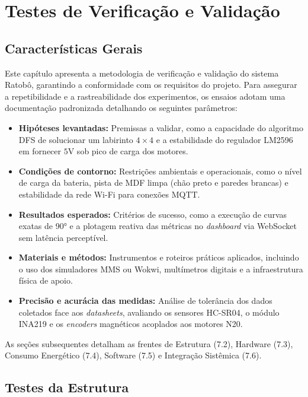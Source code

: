 \chapter{Testes de Verificação e Validação}
\vspace{-1cm}
\section{Características Gerais}

Este capítulo apresenta a metodologia de verificação e validação do sistema Ratobô, garantindo a conformidade com os requisitos do projeto. Para assegurar a repetibilidade e a rastreabilidade dos experimentos, os ensaios adotam uma documentação padronizada detalhando os seguintes parâmetros:

\begin{itemize}
    \item \textbf{Hipóteses levantadas:} Premissas a validar, como a capacidade do algoritmo DFS de solucionar um labirinto $4 \times 4$ e a estabilidade do regulador LM2596 em fornecer $5\text{V}$ sob pico de carga dos motores.
    \item \textbf{Condições de contorno:} Restrições ambientais e operacionais, como o nível de carga da bateria, pista de MDF limpa (chão preto e paredes brancas) e estabilidade da rede Wi-Fi para conexões MQTT.
    \item \textbf{Resultados esperados:} Critérios de sucesso, como a execução de curvas exatas de 90° e a plotagem reativa das métricas no \textit{dashboard} via WebSocket sem latência perceptível.
    \item \textbf{Materiais e métodos:} Instrumentos e roteiros práticos aplicados, incluindo o uso dos simuladores MMS ou Wokwi, multímetros digitais e a infraestrutura física de apoio.
    \item \textbf{Precisão e acurácia das medidas:} Análise de tolerância dos dados coletados face aos \textit{datasheets}, avaliando os sensores HC-SR04, o módulo INA219 e os \textit{encoders} magnéticos acoplados aos motores N20.
\end{itemize}

As seções subsequentes detalham as frentes de Estrutura (7.2), Hardware (7.3), Consumo Energético (7.4), Software (7.5) e Integração Sistêmica (7.6).

\section{Testes da Estrutura}

